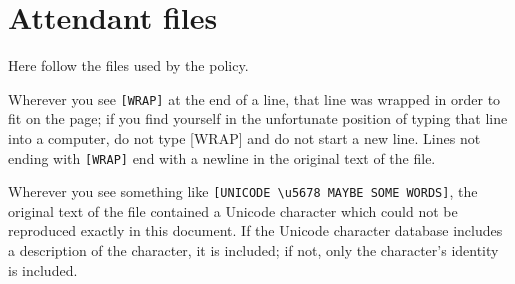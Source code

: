 %
%
%
\chapter{Attendant files}
\label{AttendantFiles}
Here follow the files used by the policy.

Wherever you see \verb![WRAP]! at the end of a line, that line was wrapped
in order to fit on the page; if you find yourself in the unfortunate
position of typing that line into a computer, do not type [WRAP] and do
not start a new line. Lines not ending with \verb![WRAP]! end with a
newline in the original text of the file.

Wherever you see something like \verb![UNICODE \u5678 MAYBE SOME WORDS]!,
the original text of the file contained a Unicode character which could
not be reproduced exactly in this document. If the Unicode character
database includes a description of the character, it is included; if not,
only the character's identity is included.



